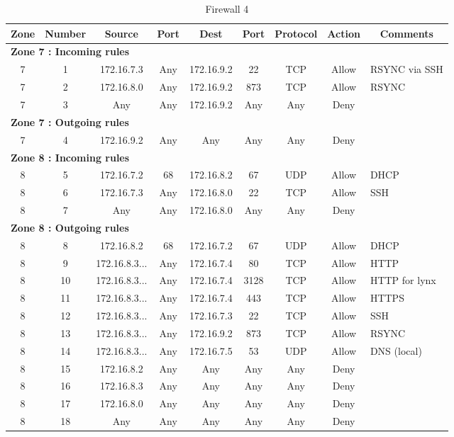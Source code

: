 \documentclass[a4paper,titlepage]{article}
\begin{document}
\begin{table}[h]
	\center
	\begin{tabular}{c|c|cc|cc|ccl}
		Zone & Number & Source & Port & Dest & Port & Protocol & Action & \multicolumn{1}{c}{Comments}\\
		\hline
		\multicolumn{9}{l}{\textbf{Zone 7 : Incoming rules}}\\
		7 & 1 & 172.16.7.3 & Any & 172.16.9.2 & 22 & TCP & Allow & RSYNC via SSH\\
		7 & 2 & 172.16.8.0 & Any & 172.16.9.2 & 873 & TCP & Allow &  RSYNC\\
		7 & 3 & Any & Any & 172.16.9.2 & Any & Any & Deny & \\
		\hline
		\multicolumn{9}{l}{\textbf{Zone 7 : Outgoing rules}}\\
		7 & 4 & 172.16.9.2 & Any & Any & Any & Any & Deny & \\

		\hline
		\multicolumn{9}{l}{\textbf{Zone 8 : Incoming rules}}\\
		8 & 5 & 172.16.7.2 & 68 &  172.16.8.2 & 67 & UDP & Allow & DHCP\\
		8 & 6 & 172.16.7.3 & Any & 172.16.8.0 & 22 & TCP & Allow & SSH \\
		8 & 7 & Any & Any & 172.16.8.0 & Any & Any & Deny & \\
		\hline
		\multicolumn{9}{l}{\textbf{Zone 8 : Outgoing rules}}\\
		8 & 8 & 172.16.8.2 & 68 & 172.16.7.2 & 67 & UDP & Allow & DHCP\\
		8 & 9 & 172.16.8.3... & Any & 172.16.7.4 & 80 & TCP & Allow & HTTP \\
		8 & 10 & 172.16.8.3... & Any & 172.16.7.4 & 3128 & TCP & Allow & HTTP for lynx\\
		8 & 11 & 172.16.8.3... & Any & 172.16.7.4 & 443 & TCP & Allow & HTTPS \\
		8 & 12 & 172.16.8.3... & Any & 172.16.7.3 & 22 & TCP & Allow & SSH \\
		8 & 13 & 172.16.8.3... & Any & 172.16.9.2 & 873 & TCP & Allow & RSYNC \\
		8 & 14 & 172.16.8.3... & Any & 172.16.7.5 & 53 & UDP & Allow & DNS (local) \\
		8 & 15 & 172.16.8.2 & Any & Any & Any & Any & Deny & \\
		8 & 16 & 172.16.8.3 & Any & Any & Any & Any & Deny & \\
		8 & 17 & 172.16.8.0 & Any & Any & Any & Any & Deny & \\
		8 & 18 & Any & Any & Any & Any & Any & Deny & \\
		\hline

	\end{tabular}
	\caption{Firewall 4}
\end{table}
\end{document}
